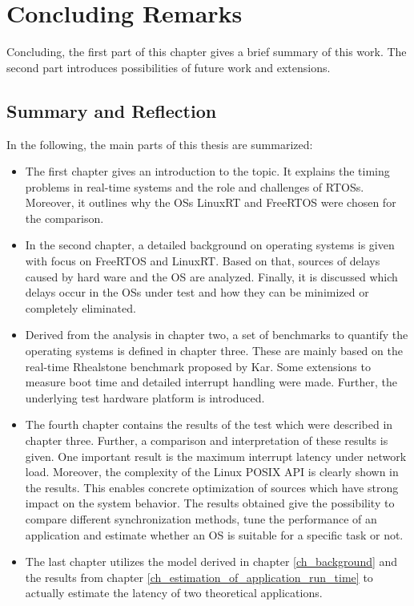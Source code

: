 \chapter{Concluding Remarks}\label{ch_conclusion}
Concluding, the first part of this chapter gives a brief summary of this work.
The second part introduces possibilities of future work and extensions.

\section{Summary and Reflection}   
In the following, the main parts of this thesis are summarized:

\begin{itemize}
	\item 
	The first chapter gives an introduction to the topic. 
	It explains the timing problems in real-time systems and the role and challenges of \acp{RTOS}.
	Moreover, it outlines why the \acp{OS} LinuxRT and FreeRTOS were chosen for the comparison.
	\item
	In the second chapter, a detailed background on operating systems is given with focus on FreeRTOS and LinuxRT.
	Based on that, sources of delays caused by hard ware and the \ac{OS} are analyzed.
	Finally, it is discussed which delays occur in the \acp{OS} under test and how they can be minimized or completely eliminated.
	\item
	Derived from the analysis in chapter two, a set of benchmarks to quantify the operating systems is defined in chapter three.
	These are mainly based on the real-time Rhealstone benchmark proposed by Kar.
	Some extensions to measure boot time and detailed interrupt handling were made.
	Further, the underlying test hardware platform is introduced.
	\item
	The fourth chapter contains the results of the test which were described in chapter three.
	Further, a comparison and interpretation of these results is given.
	One important result is the maximum interrupt latency under network load.
	Moreover, the complexity of the Linux POSIX \ac{API} is clearly shown in the results.
	This enables concrete optimization of sources which have strong impact on the system behavior.	
	The results obtained give the possibility to compare different synchronization methods, tune the performance of an application and estimate whether an \ac{OS} is suitable for a specific task or not.
	\item 
	The last chapter utilizes the model derived in chapter \ref{ch_background} and the results from chapter 	\ref{ch_estimation_of_application_run_time} to actually estimate the latency of two theoretical applications.
\end{itemize}

